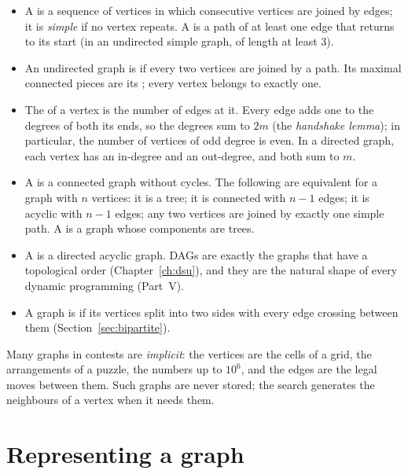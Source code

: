 \begin{itemize}
  \item A  is a sequence of vertices in which consecutive vertices are joined by edges; it is \emph{simple} if no
        vertex repeats. A  is a path of at least one edge that returns to its start (in an undirected simple graph,
        of length at least 3).
  \item An undirected graph is  if every two vertices are joined by a path. Its maximal connected pieces are
        its ; every vertex belongs to exactly one.
  \item The  of a vertex is the number of edges at it. Every edge adds one to the degrees of both its ends, so
        the degrees sum to $2m$ (the \emph{handshake lemma}); in particular, the number of vertices of odd degree is even.
        In a directed graph, each vertex has an in-degree and an out-degree, and both sum to $m$.
  \item A  is a connected graph without cycles. The following are equivalent for a graph with $n$ vertices: it is
        a tree; it is connected with $n - 1$ edges; it is acyclic with $n - 1$ edges; any two vertices are joined by exactly
        one simple path. A  is a graph whose components are trees.
  \item A  is a directed acyclic graph. DAGs are exactly the graphs that have a topological order
        (Chapter~\ref{ch:dsu}), and they are the natural shape of every dynamic programming (Part~V).
  \item A graph is  if its vertices split into two sides with every edge crossing between them
        (Section~\ref{sec:bipartite}).
\end{itemize}

Many graphs in contests are \emph{implicit}: the vertices are the cells of a grid, the arrangements of a puzzle, the numbers
up to $10^6$, and the edges are the legal moves between them. Such graphs are never stored; the search generates the
neighbours of a vertex when it needs them.

\section[Representing a graph]{Representing a graph \hfill \bronze}\label{sec:graph-rep}

